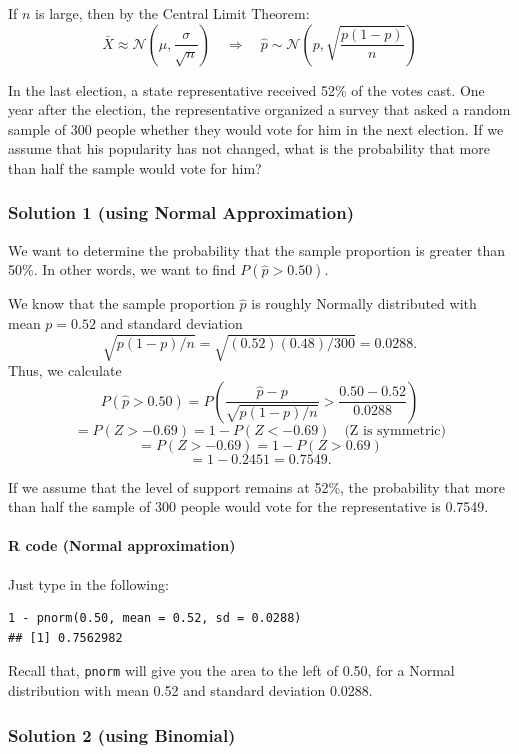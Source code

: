 If $n$ is large, then by the Central Limit Theorem:
\[
\bar{X} \approx \mathcal{N} \left( \mu, \frac{\sigma}{\sqrt{n}} \right)
\quad \Rightarrow \quad
\hat{p} \sim \mathcal{N} \left( p, \sqrt{\frac{p(1 - p)}{n}} \right)
\]
\begin{example}
In the last election, a state representative received 52\% of the votes cast. One year after the election, the representative organized a survey that asked a random sample of 300 people whether they would vote for him in the next election. If we assume that his popularity has not changed, what is the probability that more than half the sample would vote for him?


\vspace{1em}
\subsubsection*{Solution 1 (using Normal Approximation)}

We want to determine the probability that the sample proportion is greater than 50\%. In other words, we want to find $P(\hat{p} > 0.50)$.

We know that the sample proportion $\hat{p}$ is roughly Normally distributed with mean $p = 0.52$ and standard deviation
\[
\sqrt{p(1 - p)/n} = \sqrt{(0.52)(0.48)/300} = 0.0288.
\]
Thus, we calculate
\[
P(\hat{p} > 0.50) = P\left( \frac{\hat{p} - p}{\sqrt{p(1-p)/n}} > \frac{0.50 - 0.52}{0.0288} \right)
\]
\[
= P(Z > -0.69) = 1 - P(Z < -0.69) \quad \text{(Z is symmetric)}
\]
\[
= P(Z > -0.69) = 1 - P(Z > 0.69)
\]
\[
= 1 - 0.2451 = 0.7549.
\]

If we assume that the level of support remains at 52\%, the probability that more than half the sample of 300 people would vote for the representative is 0.7549.
\paragraph*{R code (Normal approximation)}

Just type in the following:

\begin{verbatim}
1 - pnorm(0.50, mean = 0.52, sd = 0.0288)
## [1] 0.7562982
\end{verbatim}

Recall that, \texttt{pnorm} will give you the area to the left of 0.50, for a Normal distribution with mean 0.52 and standard deviation 0.0288.
\subsubsection*{Solution 2 (using Binomial)}


\end{example}
